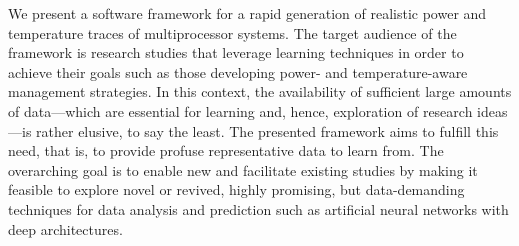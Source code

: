 We present a software framework for a rapid generation of realistic power and
temperature traces of multiprocessor systems. The target audience of the
framework is research studies that leverage learning techniques in order to
achieve their goals such as those developing power- and temperature-aware
management strategies. In this context, the availability of sufficient large
amounts of data---which are essential for learning and, hence, exploration of
research ideas---is rather elusive, to say the least. The presented framework
aims to fulfill this need, that is, to provide profuse representative data to
learn from. The overarching goal is to enable new and facilitate existing
studies by making it feasible to explore novel or revived, highly promising, but
data-demanding techniques for data analysis and prediction such as artificial
neural networks with deep architectures.
